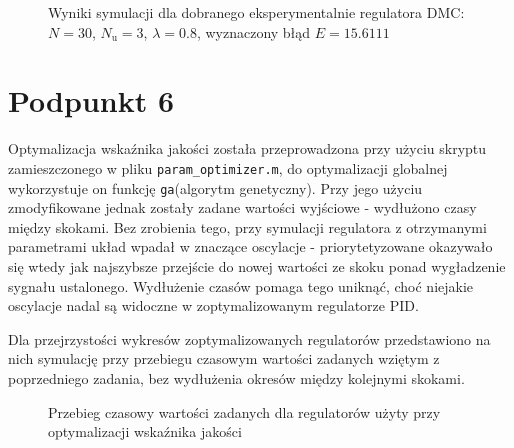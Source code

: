 \begin{figure}[ht]
\centering
{}
\caption{Wyniki symulacji dla dobranego eksperymentalnie regulatora DMC: \\$N=30$, $N_{\mathrm{u}}=3$, $\lambda=\num{0,8}$, wyznaczony błąd $E=\num{15,6111}$}
\label{Z5manualDMC}
\end{figure}

\chapter{Podpunkt 6}
Optymalizacja wskaźnika jakości została przeprowadzona przy użyciu skryptu zamieszczonego w pliku \verb+param_optimizer.m+, do optymalizacji globalnej wykorzystuje on funkcję \verb+ga+(algorytm genetyczny). Przy jego użyciu zmodyfikowane jednak zostały zadane wartości wyjściowe - wydłużono czasy między skokami. Bez zrobienia tego, przy symulacji regulatora z otrzymanymi parametrami układ wpadał w znaczące oscylacje - priorytetyzowane okazywało się wtedy jak najszybsze przejście do nowej wartości ze skoku ponad wygładzenie sygnału ustalonego. Wydłużenie czasów pomaga tego uniknąć, choć niejakie oscylacje nadal są widoczne w zoptymalizowanym regulatorze PID.

Dla przejrzystości wykresów zoptymalizowanych regulatorów przedstawiono na nich symulację przy przebiegu czasowym wartości zadanych wziętym z poprzedniego zadania, bez wydłużenia okresów między kolejnymi skokami.

\begin{figure}[ht]
\centering
{}
\caption{Przebieg czasowy wartości zadanych dla regulatorów użyty przy optymalizacji wskaźnika jakości}
\label{Z6optimizedPID}
\end{figure}

